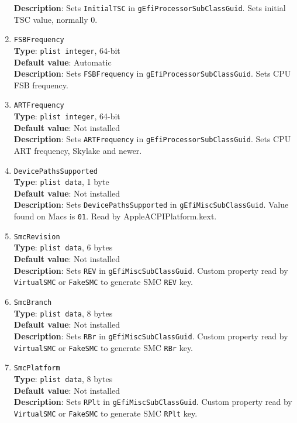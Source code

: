 \documentclass[]{article}
\begin{document}
\begin{enumerate}
  \textbf{Description}: Sets \texttt{InitialTSC} in
  \texttt{gEfiProcessorSubClassGuid}. Sets initial TSC value, normally
  0.
\item
  \texttt{FSBFrequency}\\
  \textbf{Type}: \texttt{plist\ integer}, 64-bit\\
  \textbf{Default value}: Automatic\\
  \textbf{Description}: Sets \texttt{FSBFrequency} in
  \texttt{gEfiProcessorSubClassGuid}. Sets CPU FSB frequency.
\item
  \texttt{ARTFrequency}\\
  \textbf{Type}: \texttt{plist\ integer}, 64-bit\\
  \textbf{Default value}: Not installed\\
  \textbf{Description}: Sets \texttt{ARTFrequency} in
  \texttt{gEfiProcessorSubClassGuid}. Sets CPU ART frequency, Skylake
  and newer.
\item
  \texttt{DevicePathsSupported}\\
  \textbf{Type}: \texttt{plist\ data}, 1 byte\\
  \textbf{Default value}: Not installed\\
  \textbf{Description}: Sets \texttt{DevicePathsSupported} in
  \texttt{gEfiMiscSubClassGuid}. Value found on Macs is \texttt{01}.
  Read by AppleACPIPlatform.kext.
\item
  \texttt{SmcRevision}\\
  \textbf{Type}: \texttt{plist\ data}, 6 bytes\\
  \textbf{Default value}: Not installed\\
  \textbf{Description}: Sets \texttt{REV} in
  \texttt{gEfiMiscSubClassGuid}. Custom property read by
  \texttt{VirtualSMC} or \texttt{FakeSMC} to generate SMC \texttt{REV}
  key.
\item
  \texttt{SmcBranch}\\
  \textbf{Type}: \texttt{plist\ data}, 8 bytes\\
  \textbf{Default value}: Not installed\\
  \textbf{Description}: Sets \texttt{RBr} in
  \texttt{gEfiMiscSubClassGuid}. Custom property read by
  \texttt{VirtualSMC} or \texttt{FakeSMC} to generate SMC \texttt{RBr}
  key.
\item
  \texttt{SmcPlatform}\\
  \textbf{Type}: \texttt{plist\ data}, 8 bytes\\
  \textbf{Default value}: Not installed\\
  \textbf{Description}: Sets \texttt{RPlt} in
  \texttt{gEfiMiscSubClassGuid}. Custom property read by
  \texttt{VirtualSMC} or \texttt{FakeSMC} to generate SMC \texttt{RPlt}
  key.
\end{enumerate}
\end{document}

